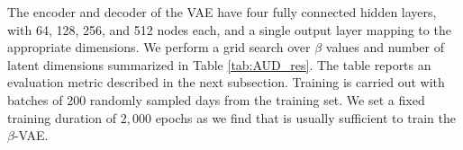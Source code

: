 \documentclass[onefignum,onetabnum]{siamonline190516}
\begin{document}
The encoder and decoder of the VAE have four fully connected hidden layers, with 64, 128, 256, and 512 nodes each, and a single output layer mapping to the appropriate dimensions.  We perform a grid search over $\beta$ values and number of latent dimensions summarized in Table \ref{tab:AUD_res}. The table reports an evaluation metric described in the next subsection. Training is carried out with batches of $200$ randomly sampled days from the training set. We set a fixed training duration of $2,000$ epochs as we find that is usually sufficient to train the $\beta$-VAE.%
% 
\end{document}
